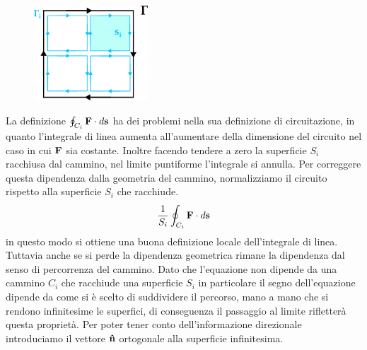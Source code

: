 \begin{figure}
    \centering
    \includegraphics[width=0.38\textwidth]{images/rot} %
\end{figure}
La definizione $\oint_{C_i} \bold{F} \cdot d \bold{s}$ ha dei problemi nella sua definizione di circuitazione, in quanto l'integrale di linea aumenta all'aumentare della dimensione del circuito nel caso in cui $\bold{F}$ sia costante. Inoltre facendo tendere a zero la superficie $S_i$ racchiusa dal cammino, nel limite puntiforme l'integrale si annulla. Per correggere questa dipendenza dalla geometria del cammino, normalizziamo il circuito rispetto alla superficie $S_i$ che racchiude.
\begin{equation*}
	\frac{1}{S_i} \oint_{C_i} \bold{F} \cdot d\bold{s}
\end{equation*} 
in questo modo si ottiene una buona definizione locale dell'integrale di linea. Tuttavia anche se si perde la dipendenza geometrica rimane la dipendenza dal senso di percorrenza del cammino.
Dato che l'equazione non dipende da una cammino $C_i$ che racchiude una superficie $S_i$ in particolare il segno dell'equazione dipende da come si \`e scelto di suddividere il percorso, mano a mano che si rendono infinitesime le superfici, di conseguenza il passaggio al limite rifletter\`a questa propriet\`a.  Per poter tener conto dell'informazione direzionale introduciamo il vettore $\bold{\hat{n}}$ ortogonale alla superficie infinitesima. 

